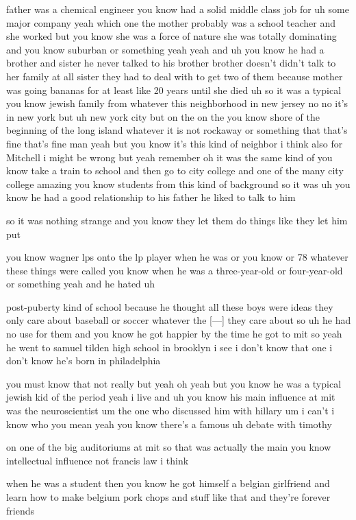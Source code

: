 \begin{description}
father was a chemical engineer you know had a solid middle class job for uh some major company yeah which one the mother probably was a school teacher and she worked but you know she was a force of nature she was totally dominating and you know suburban or something yeah yeah and uh you know he had a brother and sister he never talked to his brother brother doesn't didn't talk to her family at all sister they had to deal with to get two of them because mother was going bananas for at least like 20 years until she died uh so it was a typical you know jewish family from whatever this neighborhood in new jersey no no it's in new york but uh new york city but on the on the you know shore of the beginning of the long island whatever it is not rockaway or something that that's fine that's fine man yeah but you know it's this kind of neighbor i think also for Mitchell i might be wrong but yeah remember oh it was the same kind of you know take a train to school and then go to city college and one of the many city college amazing you know students from this kind of background so it was uh you know he had a good relationship to his father he liked to talk to him

so it was nothing strange and you know they let them do things like they let him put

you know wagner lps onto the lp player when he was or you know or 78 whatever these things were called you know when he was a three-year-old or four-year-old or something yeah and he hated uh

post-puberty kind of school because he thought all these boys were ideas they only care about baseball or soccer whatever the [---] they care about so uh he had no use for them and you know he got happier by the time he got to mit so yeah he went to samuel tilden high school in brooklyn i see i don't know that one i don't know he's born in philadelphia

you must know that not really but yeah oh yeah but you know he was a typical jewish kid of the period yeah i live and uh you know his main influence at mit was the neuroscientist um the one who discussed him with hillary um i can't i know who you mean yeah you know there's a famous uh debate with timothy

on one of the big auditoriums at mit so that was actually the main you know intellectual influence not francis law i think

when he was a student then you know he got himself a belgian girlfriend and learn how to make belgium pork chops and stuff like that and they're forever friends


\end{description}
